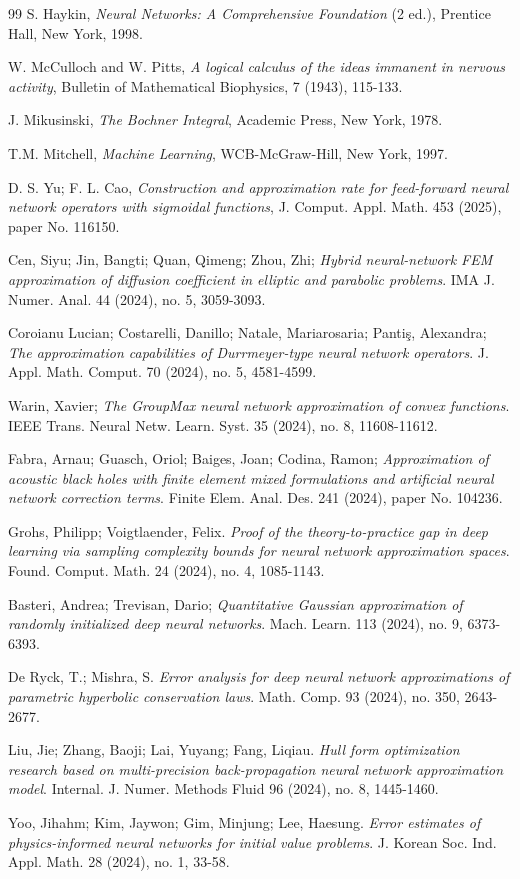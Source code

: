 \documentclass[10pt]{NSP1}
\numberwithin{equation}{section}
\begin{document}
\begin{thebibliography}{99}
 S. Haykin, \textit{Neural Networks: A Comprehensive Foundation}
(2 ed.), Prentice Hall, New York, 1998.

 W. McCulloch and W. Pitts, \textit{A logical calculus of the
ideas immanent in nervous activity}, Bulletin of Mathematical Biophysics, 7
(1943), 115-133.

 J. Mikusinski, \textit{The Bochner Integral}, Academic Press,
New York, 1978.

 T.M. Mitchell, \textit{Machine Learning}, WCB-McGraw-Hill, New
York, 1997.

 D. S. Yu; F. L. Cao, \textit{Construction and approximation
rate for feed-forward neural network operators with sigmoidal functions}, J.
Comput. Appl. Math. 453 (2025), paper No. 116150.

 Cen, Siyu; Jin, Bangti; Quan, Qimeng; Zhou, Zhi; \textit{Hybrid
neural-network FEM approximation of diffusion coefficient in elliptic and
parabolic problems}. IMA J. Numer. Anal. 44 (2024), no. 5, 3059-3093.

 Coroianu Lucian; Costarelli, Danillo; Natale, Mariarosaria;
Panti\c{s}, Alexandra; \textit{The approximation capabilities of
Durrmeyer-type neural network operators}. J. Appl. Math. Comput. 70 (2024),
no. 5, 4581-4599.

 Warin, Xavier; \textit{The GroupMax neural network
approximation of convex functions}. IEEE Trans. Neural Netw. Learn. Syst. 35
(2024), no. 8, 11608-11612.

 Fabra, Arnau; Guasch, Oriol; Baiges, Joan; Codina, Ramon;
\textit{Approximation of acoustic black holes with finite element mixed
formulations and artificial neural network correction terms}. Finite Elem.
Anal. Des. 241 (2024), paper No. 104236.

 Grohs, Philipp; Voigtlaender, Felix. \textit{Proof of the
theory-to-practice gap in deep learning via sampling complexity bounds for
neural network approximation spaces}. Found. Comput. Math. 24 (2024), no. 4,
1085-1143.

 Basteri, Andrea; Trevisan, Dario; \textit{Quantitative Gaussian
approximation of randomly initialized deep neural networks}. Mach. Learn.
113 (2024), no. 9, 6373-6393.

 De Ryck, T.; Mishra, S. \textit{Error analysis for deep neural
network approximations of parametric hyperbolic conservation laws}. Math.
Comp. 93 (2024), no. 350, 2643-2677.

 Liu, Jie; Zhang, Baoji; Lai, Yuyang; Fang, Liqiau. \textit{Hull
form optimization research based on multi-precision back-propagation neural
network approximation model}. Internal. J. Numer. Methods Fluid 96 (2024),
no. 8, 1445-1460.

 Yoo, Jihahm; Kim, Jaywon; Gim, Minjung; Lee, Haesung. \textit{%
Error estimates of physics-informed neural networks for initial value
problems}. J. Korean Soc. Ind. Appl. Math. 28 (2024), no. 1, 33-58.
\end{thebibliography}
\end{document}
